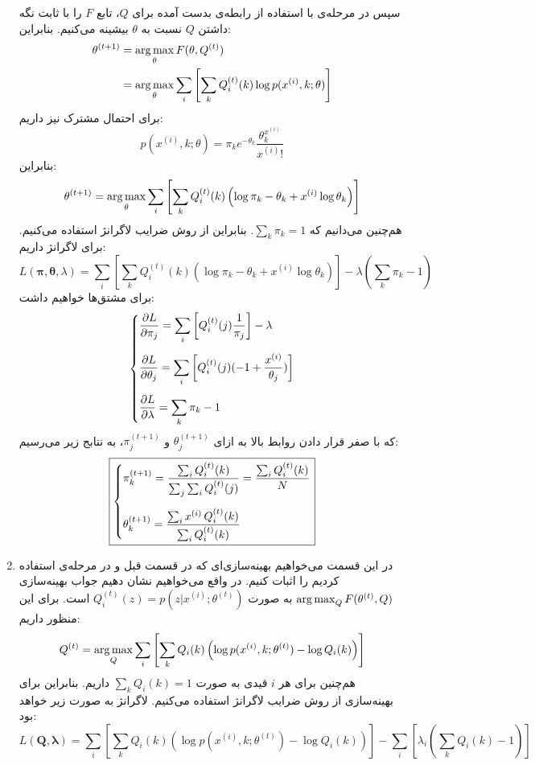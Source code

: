 \documentclass[a4paper, 12pt]{article}
\begin{document}
\begin{enumerate}
	سپس در مرحله‌ی  با استفاده از رابطه‌ی بدست آمده برای $Q$، تابع $F$ را با ثابت نگه داشتن $Q$ نسبت به $\theta$ بیشینه می‌کنیم. بنابراین:
	\[
	\begin{aligned}
		\theta^{(t+1)} &= \operatorname*{arg\,max}_\theta F(\theta, Q^{(t)}) \\
		&= \operatorname*{arg\,max}_\theta \sum_i\left[\sum_k Q_i^{(t)}(k) \log p(x^{(i)}, k; \theta)\right]
	\end{aligned}
	\]
	برای احتمال مشترک نیز داریم:
	\[
	p(x^{(i)}, k; \theta) = \pi_k e^{-\theta_k}\frac{\theta_k^{x^{(i)}}}{x^{(i)}!}
	\]
	بنابراین:
	\[
	\theta^{(t+1)} = \operatorname*{arg\,max}_\theta \sum_i\left[\sum_k Q_i^{(t)}(k)\left(\log \pi_k - \theta_k + x^{(i)}\log \theta_k \right)\right]
	\]
	هم‌چنین می‌دانیم که
	$\sum_k \pi_k = 1$.
	بنابراین از روش ضرایب لاگرانژ استفاده می‌کنیم. برای لاگرانژ داریم:
	\[
	L(\bm{\pi}, \bm{\theta}, \lambda) = \sum_i\left[\sum_k Q_i^{(t)}(k)\left(\log \pi_k - \theta_k + x^{(i)}\log \theta_k \right)\right] - \lambda(\sum_k \pi_k - 1)
	\]
	برای مشتق‌ها خواهیم داشت:
	\[
	\begin{dcases}
		\frac{\partial L}{\partial \pi_j} = \sum_i\left[Q_i^{(t)}(j) \frac{1}{\pi_j}\right] - \lambda \\[0.5em]
		\frac{\partial L}{\partial \theta_j} = \sum_i\left[Q_i^{(t)}(j)(-1 + \frac{x^{(i)}}{\theta_j}) \right] \\[0.5em]
		\frac{\partial L}{\partial \lambda} = \sum_k \pi_k - 1
	\end{dcases}
	\]
	که با صفر قرار دادن روابط بالا به ازای
	$\theta_j^{(t+1)}$
	و
	$\pi_j^{(t+1)}$،
	به نتابج زیر می‌رسیم:
	\[
	\boxed{
	\begin{dcases}
		\pi_k^{(t+1)} = \frac{\sum_i Q_i^{(t)}(k)}{\sum_j\sum_i Q_i^{(t)}(j)} = \frac{\sum_i Q_i^{(t)}(k)}{N} \\[0.6em]
		\theta_k^{(t+1)} = \frac{\sum_i x^{(i)}\,Q_i^{(t)}(k)}{\sum_i Q_i^{(t)}(k)}
	\end{dcases}
	}
	\]
	\item
	در این قسمت می‌خواهیم بهینه‌سازی‌ای که در قسمت قبل و در مرحله‌ی  استفاده کردیم را اثبات کنیم. در واقع می‌خواهیم نشان دهیم جواب بهینه‌سازی
	$\operatorname*{arg\,max}_Q F(\theta^{(t)}, Q)$
	به صورت
	$Q_i^{(t)}(z) = p(z|x^{(i)}; \theta^{(t)})$
	است. برای این منظور داریم:
	\[
	Q^{(t)} = \operatorname*{arg\,max}_Q \sum_i\left[\sum_k Q_i(k) \left(\log p(x^{(i)}, k; \theta^{(t)}) - \log Q_i(k)\right) \right]
	\]
	هم‌چنین برای هر $i$ قیدی به صورت
	$\sum_k Q_i(k) = 1$
	داریم.	بنابراین برای بهینه‌سازی از روش ضرایب لاگرانژ استفاده می‌کنیم. لاگرانژ به صورت زیر خواهد بود:
	\[
	L(\bm{Q}, \bm{\lambda}) = \sum_i\left[\sum_k Q_i(k) \left(\log p(x^{(i)}, k; \theta^{(t)}) - \log Q_i(k)\right) \right] - \sum_i\left[ \lambda_i\left(\sum_k Q_i(k) - 1\right)\right]
\]
\end{enumerate}
\end{document}

